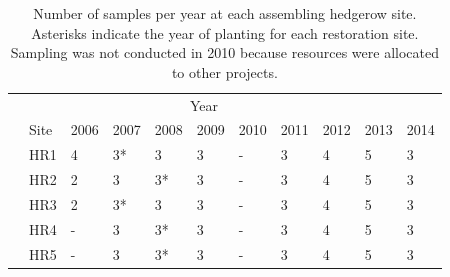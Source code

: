 \documentclass[12pt]{article}
\begin{document}
\doublespacing
\linenumbers

\renewcommand{\thesection}{S\arabic{section}} \setcounter{section}{0}
\renewcommand{\theequation}{S\arabic{equation}}
\setcounter{equation}{0} \renewcommand{\thetable}{S\arabic{table}}
\setcounter{table}{0} %
\renewcommand{\thefigure}{S\arabic{figure}} \setcounter{figure}{0}
\setcounter{page}{1}

\newcommand{\lkmcomment}[1] {
  \textcolor{red}{\it{[#1]}}
}


\begin{table}
  \renewcommand*\arraystretch{1.25}
  \centering
  \caption{Number of samples per year at each assembling hedgerow site. Asterisks indicate
    the year of planting for each restoration site. Sampling was not
    conducted in 2010 because resources were allocated to other
    projects.} 
  \begin{tabular}{lllllllllll}
    \hline
    \multicolumn{10}{c}{\hspace{10em}Year}\\
    & Site & 2006 & 2007 & 2008 & 2009 & 2010 & 2011 & 2012 & 2013 & 2014\\
    \hline
    &HR1 & 4 & 3* & 3 & 3 & - & 3 & 4 & 5 & 3 \\ 
    &HR2 & 2 & 3 & 3* & 3 & - & 3 & 4 & 5 & 3 \\
    &HR3 & 2 & 3* & 3 & 3 & - & 3 & 4 & 5 & 3 \\
    &HR4 & - & 3 & 3* & 3 & - & 3 & 4 & 5 & 3 \\
    &HR5 & - & 3 & 3* & 3 & - & 3 & 4 & 5 & 3 \\
    \hline
  \end{tabular}
  \label{tab:maturing}
\end{table}
\clearpage
\end{document}
